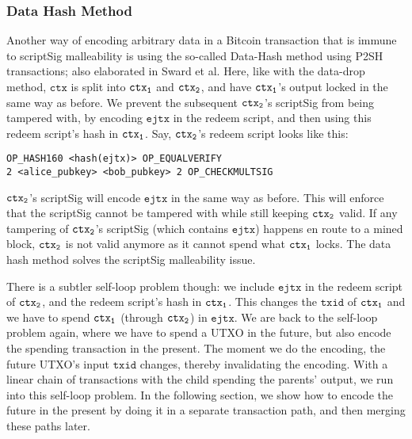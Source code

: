\subsubsection{Data Hash Method}
\sloppy
Another way of encoding arbitrary data in a Bitcoin transaction that is immune to scriptSig malleability is using the so-called Data-Hash method using P2SH transactions; also elaborated in Sward et al\cite{sward2018data}. Here, like with the data-drop method, $\texttt{ctx}$ is split into $\texttt{ctx\textsubscript{1}}$ and $\texttt{ctx\textsubscript{2}}$, and have $\texttt{ctx\textsubscript{1}}$'s output locked in the same way as before. We prevent the subsequent $\texttt{ctx\textsubscript{2}}$'s scriptSig from being tampered with, by encoding $\texttt{ejtx}$ in the redeem script, and then using this redeem script's hash in $\texttt{ctx\textsubscript{1}}$. Say, $\texttt{ctx\textsubscript{2}}$'s redeem script looks like this: 
\begin{verbatim}
OP_HASH160 <hash(ejtx)> OP_EQUALVERIFY
2 <alice_pubkey> <bob_pubkey> 2 OP_CHECKMULTSIG
\end{verbatim}

$\texttt{ctx\textsubscript{2}}$'s scriptSig will encode $\texttt{ejtx}$ in the same way as before. This will enforce that the scriptSig cannot be tampered with while still keeping $\texttt{ctx\textsubscript{2}}$ valid. If any tampering of $\texttt{ctx\textsubscript{2}}$'s scriptSig (which contains $\texttt{ejtx}$) happens en route to a mined block, $\texttt{ctx\textsubscript{2}}$ is not valid anymore as it cannot spend what $\texttt{ctx\textsubscript{1}}$ locks. The data hash method solves the scriptSig malleability issue. 

There is a subtler self-loop problem though: we include $\texttt{ejtx}$ in the redeem script of $\texttt{ctx\textsubscript{2}}$, and the redeem script's hash in $\texttt{ctx\textsubscript{1}}$. This changes the $\texttt{txid}$ of $\texttt{ctx\textsubscript{1}}$ and we have to spend $\texttt{ctx\textsubscript{1}}$ (through $\texttt{ctx\textsubscript{2}}$) in $\texttt{ejtx}$. We are back to the self-loop problem again, where we have to spend a UTXO in the future, but also encode the spending transaction in the present. The moment we do the encoding, the future UTXO's input $\texttt{txid}$ changes, thereby invalidating the encoding. With a linear chain of transactions with the child spending the parents' output, we run into this self-loop problem. In the following section, we show how to encode the future in the present by doing it in a separate transaction path, and then merging these paths later.

